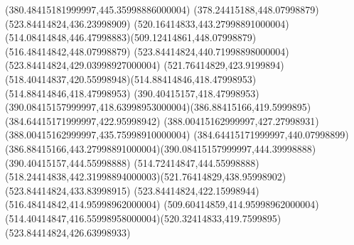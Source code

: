 {{	\lineto(380.48415181999997,445.35998886000004)
	\lineto(378.24415188,448.07998879)
	\closepath
	\moveto(523.84414824,436.23998909)
	\curveto(520.16414833,443.27998891000004)(514.08414848,446.47998883)(509.12414861,448.07998879)
	\lineto(516.48414842,448.07998879)
	\lineto(523.84414824,440.71998898000004)
	\closepath
	\moveto(523.84414824,429.03998927000004)
	\curveto(521.76414829,423.9199894)(518.40414837,420.55998948)(514.88414846,418.47998953)
	\lineto(514.88414846,418.47998953)
	\lineto(390.40415157,418.47998953)
	\curveto(390.08415157999997,418.63998953000004)(386.88415166,419.5999895)(384.64415171999997,422.95998942)
	\lineto(388.00415162999997,427.27998931)
	\lineto(388.00415162999997,435.75998910000004)
	\lineto(384.64415171999997,440.07998899)
	\curveto(386.88415166,443.27998891000004)(390.08415157999997,444.39998888)(390.40415157,444.55998888)
	\lineto(514.72414847,444.55998888)
	\curveto(518.24414838,442.31998894000003)(521.76414829,438.95998902)(523.84414824,433.83998915)
	\closepath
	\moveto(523.84414824,422.15998944)
	\lineto(516.48414842,414.95998962000004)
	\lineto(509.60414859,414.95998962000004)
	\curveto(514.40414847,416.55998958000004)(520.32414833,419.7599895)(523.84414824,426.63998933)
	\closepath
}
}
{
}
